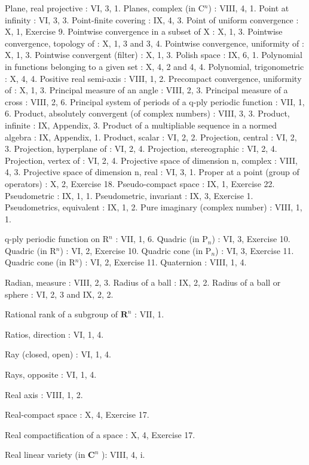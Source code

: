 Plane, real projective : VI, 3, 1. Planes, complex (in C\(^{n}\)) : VIII, 4, 1. Point at infinity : VI, 3, 3. Point-finite covering : IX, 4, 3. Point of uniform convergence : X, 1, Exercise 9. Pointwise convergence in a subset of X : X, 1, 3. Pointwise convergence, topology of : X, 1, 3 and 3, 4. Pointwise convergence, uniformity of : X, 1, 3. Pointwise convergent (filter) : X, 1, 3. Polish space : IX, 6, 1. Polynomial in functions belonging to a given set : X, 4, 2 and 4, 4. Polynomial, trigonometric : X, 4, 4. Positive real semi-axis : VIII, 1, 2. Precompact convergence, uniformity of : X, 1, 3. Principal measure of an angle : VIII, 2, 3. Principal measure of a cross : VIII, 2, 6. Principal system of periods of a q-ply periodic function : VII, 1, 6. Product, absolutely convergent (of complex numbers) : VIII, 3, 3. Product, infinite : IX, Appendix, 3. Product of a multipliable sequence in a normed algebra : IX, Appendix, 1. Product, scalar : VI, 2, 2. Projection, central : VI, 2, 3. Projection, hyperplane of : VI, 2, 4. Projection, stereographic : VI, 2, 4. Projection, vertex of : VI, 2, 4. Projective space of dimension n, complex : VIII, 4, 3. Projective space of dimension n, real : VI, 3, 1. Proper at a point (group of operators) : X, 2, Exercise 18. Pseudo-compact space : IX, 1, Exercise 22. Pseudometric : IX, 1, 1. Pseudometric, invariant : IX, 3, Exercise 1. Pseudometrics, equivalent : IX, 1, 2. Pure imaginary (complex number) : VIII, 1, 1.

q-ply periodic function on R\(^{n}\) : VII, 1, 6. Quadric (in P\(_{n}\)) : VI, 3, Exercise 10. Quadric (in R\(^{n}\)) : VI, 2, Exercise 10. Quadric cone (in P\(_{n}\)) : VI, 3, Exercise 11. Quadric cone (in R\(^{n}\)) : VI, 2, Exercise 11. Quaternion : VIII, 1, 4.

Radian, measure : VIII, 2, 3. Radius of a ball : IX, 2, 2. Radius of a ball or sphere : VI, 2, 3 and IX, 2, 2.

Rational rank of a subgroup of \(\mathbf{R}^n\) : VII, 1.

Ratios, direction : VI, 1, 4.

Ray (closed, open) : VI, 1, 4.

Rays, opposite : VI, 1, 4.

Real axis : VIII, 1, 2.

Real-compact space : X, 4, Exercise 17.

Real compactification of a space : X, 4, Exercise 17.

Real linear variety (in \(\mathbf{C}^n\) ): VIII, 4, i.

